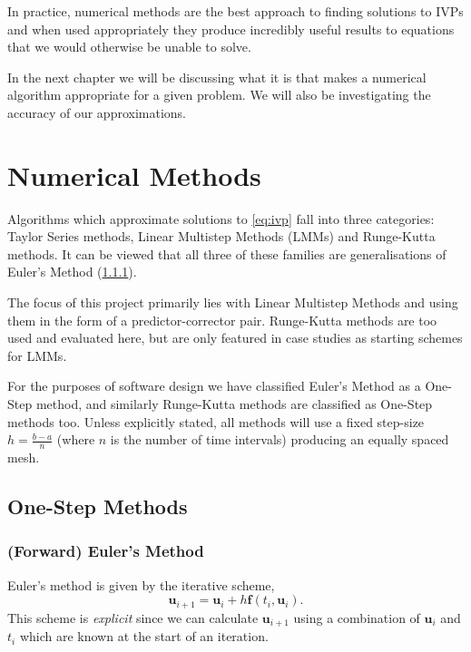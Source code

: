 \documentclass[12pt, twoside]{report}
\theoremstyle{plain}
\theoremstyle{definition}
\theoremstyle{definition}
\begin{document}
        In practice, numerical methods are the best approach to finding 
        solutions to IVPs and when used appropriately they produce incredibly 
        useful results to equations that we would otherwise be unable to solve.

        In the next chapter we will be discussing what it is that makes a 
        numerical algorithm appropriate for a given problem. We will also be
        investigating the accuracy of our approximations.



\chapter{Numerical Methods}
\label{2_methods}
    Algorithms which approximate solutions to \eqref{eq:ivp} fall into three
    categories: Taylor Series methods, Linear Multistep Methods (LMMs) and 
    Runge-Kutta methods. It can be viewed that all three of these families are
    generalisations of Euler's Method (\ref{2_forward_euler}). 

    The focus of this project primarily lies with Linear Multistep Methods and 
    using them in the form of a predictor-corrector pair. Runge-Kutta methods
    are too used and evaluated here, but are only featured in case studies
    as starting schemes for LMMs.

    For the purposes of software design we have classified Euler's Method as a
    One-Step method, and similarly Runge-Kutta methods are classified as 
    One-Step methods too. Unless explicitly stated, all methods will use a 
    fixed step-size $h=\frac{b-a}{n}$ (where $n$ is the number of time 
    intervals) producing an equally spaced mesh.

    \section{One-Step Methods}
    \label{2_onestep}
        
        \subsection{(Forward) Euler's Method}
        \label{2_forward_euler}
            Euler's method is given by the iterative scheme,
            \begin{equation}
            \label{eq:euler}
                \mathbf{u}_{i+1} = \mathbf{u}_i + h\mathbf{f}(t_i, 
                \mathbf{u}_i).
            \end{equation}
            This scheme is \textit{explicit} since we can calculate 
            $\mathbf{u}_{i+1}$ using a combination of $\mathbf{u}_i$ and $t_i$
            which are known at the start of an iteration.
\end{document}

